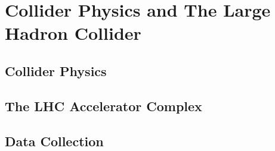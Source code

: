 \chapter{Collider Physics and The Large Hadron Collider}
\label{sec:lhc}





\section{Collider Physics}
\section{The LHC Accelerator Complex}
\section{Data Collection}
